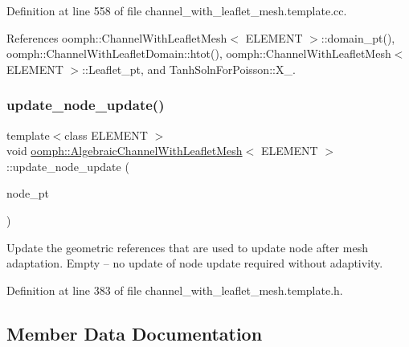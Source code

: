Definition at line 558 of file channel\+\_\+with\+\_\+leaflet\+\_\+mesh.\+template.\+cc.



References oomph\+::\+Channel\+With\+Leaflet\+Mesh$<$ E\+L\+E\+M\+E\+N\+T $>$\+::domain\+\_\+pt(), oomph\+::\+Channel\+With\+Leaflet\+Domain\+::htot(), oomph\+::\+Channel\+With\+Leaflet\+Mesh$<$ E\+L\+E\+M\+E\+N\+T $>$\+::\+Leaflet\+\_\+pt, and Tanh\+Soln\+For\+Poisson\+::\+X\+\_.

\mbox{\label{classoomph_1_1AlgebraicChannelWithLeafletMesh_ace3a90b4e530c75bec8301e2291151eb}} 
\subsubsection{\texorpdfstring{update\+\_\+node\+\_\+update()}{update\_node\_update()}}
{\footnotesize\ttfamily template$<$class E\+L\+E\+M\+E\+NT $>$ \\
void \hyperlink{classoomph_1_1AlgebraicChannelWithLeafletMesh}{oomph\+::\+Algebraic\+Channel\+With\+Leaflet\+Mesh}$<$ E\+L\+E\+M\+E\+NT $>$\+::update\+\_\+node\+\_\+update (\begin{DoxyParamCaption}\item[{Algebraic\+Node $\ast$\&}]{node\+\_\+pt }\end{DoxyParamCaption})\hspace{0.3cm}{\ttfamily [inline]}}



Update the geometric references that are used to update node after mesh adaptation. Empty -- no update of node update required without adaptivity. 



Definition at line 383 of file channel\+\_\+with\+\_\+leaflet\+\_\+mesh.\+template.\+h.



\subsection{Member Data Documentation}
\mbox{\label{classoomph_1_1AlgebraicChannelWithLeafletMesh_a22e6274b52941ae60cbe66287dd02fb4}} 
